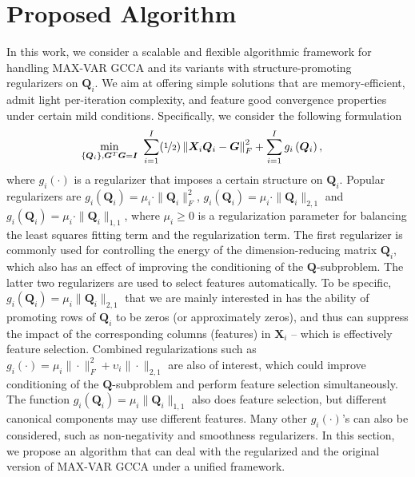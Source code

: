 \documentclass[10pt,journal]{IEEEtran}
\newcommand{\G}{\boldsymbol{G}}
\newcommand{\Q}{\boldsymbol{Q}}
\newcommand{\X}{\boldsymbol{X}}
\begin{document}
%


\section{Proposed Algorithm}
In this work, we consider a scalable and flexible algorithmic framework for handling MAX-VAR GCCA and its variants with structure-promoting regularizers on $\Q_i$.
We aim at offering
simple solutions that are memory-efficient, admit light per-iteration complexity, and feature good convergence properties under certain mild conditions.
Specifically, we consider the following formulation
\begin{equation}\label{eq:CGCCA_reg}
\begin{aligned}
\min_{\{{\bm Q}_i\},\G^T\G={\bm I}} &~\sum_{i=1}^{I}(\nicefrac{1}{2})\left\|{\bm X}_i{\bm Q}_i-{\bm G}\right\|_F^2+\sum_{i=1}^I  g_i\left(\Q_i\right),
\end{aligned}
\end{equation}
where $g_i(\cdot)$ is a regularizer that imposes a certain structure on $\Q_i$.
Popular regularizers are $g_i(\Q_i)=\mu_i\cdot\|\Q_i\|_{F}^2$, $g_i(\Q_i)=\mu_i\cdot\|\Q_i\|_{2,1}$ and $g_i(\Q_i)=\mu_i\cdot\|\Q_i\|_{1,1}$, where $\mu_i\geq 0$ is a regularization parameter for balancing the least squares fitting term and the regularization term.
The first regularizer is commonly used for controlling the energy of the dimension-reducing matrix $\Q_i$, which also has an effect of improving the conditioning of the $\Q$-subproblem.
The latter two regularizers are used to select features automatically. To be specific,  $g_i(\Q_i)=\mu_i\|\Q_i\|_{2,1}$ that we are mainly interested in has the ability of promoting rows of $\Q_i$ to be zeros (or approximately zeros), and thus can suppress the impact of the corresponding columns (features) in $\X_i$ -- which is effectively feature selection.
Combined regularizations such as
$g_i(\cdot) = \mu_i\|\cdot\|_F^2 + \upsilon_i\|\cdot\|_{2,1}$
are also of interest, which could improve conditioning of the $\Q$-subproblem
and perform feature selection simultaneously.
The function $g_i(\Q_i)=\mu_i\|\Q_i\|_{1,1}$ also does feature selection, but different canonical components may use different features.
Many other $g_i(\cdot)$'s can also be considered, such as non-negativity and smoothness regularizers.
In this section, we propose an algorithm that can deal with the regularized and the original version of MAX-VAR GCCA under a unified framework.
\end{document}
